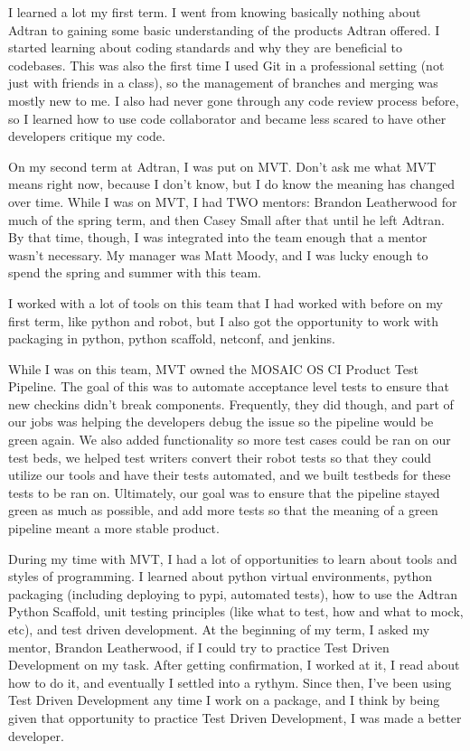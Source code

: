 \documentclass[12pt, letterpaper]{article}
\begin{document}
\par
I learned a lot my first term. I went from knowing basically nothing about Adtran to gaining some
basic understanding of the products Adtran offered. I started learning about coding standards and why they are beneficial to codebases. This was also the first time I used Git in a
professional setting (not just with friends in a class), so the management of branches and merging
was mostly new to me. I also had never gone through any code review process before, so I learned
how to use code collaborator and became less scared to have other developers critique my code.

\par
On my second term at Adtran, I was put on MVT. Don't ask me what MVT means right now, because I
don't know, but I do know the meaning has changed over time. While I was on MVT, I had TWO mentors:
Brandon Leatherwood for much of the spring term, and then Casey Small after that until he left
Adtran. By that time, though, I was integrated into the team enough that a mentor wasn't necessary.
My manager was Matt Moody, and I was lucky enough to spend the spring and summer with this team.

\par
I worked with a lot of tools on this team that I had worked with before on my first term,
like python and robot, but I also got the opportunity to work with packaging in python, python scaffold, netconf, and jenkins.

\par
While I was on this team, MVT owned the MOSAIC OS CI Product Test Pipeline. The goal of this was to
automate acceptance level tests to ensure that new checkins didn't break components. Frequently,
they did though, and part of our jobs was helping the developers debug the issue so the pipeline
would be green again. We also added functionality so more test cases could be ran on our test beds,
we helped test writers convert their robot tests so that they could utilize our tools and have
their tests automated, and we built testbeds for these tests to be ran on. Ultimately, our goal was
to ensure that the pipeline stayed green as much as possible, and add more tests so that the
meaning of a green pipeline meant a more stable product.

\par
During my time with MVT, I had a lot of opportunities to learn about tools and styles of
programming. I learned about python virtual environments, python packaging (including deploying to
pypi, automated tests), how to use the Adtran Python Scaffold, unit testing principles (like what
to test, how and what to mock, etc), and test driven development. At the beginning of my term, I
asked my mentor, Brandon Leatherwood, if I could try to practice Test Driven Development on my
task. After getting confirmation, I worked at it, I read about how to do it, and eventually I
settled into a rythym. Since then, I've been using Test Driven Development any time I work on a
package, and I think by being given that opportunity to practice Test Driven Development, I was
made a better developer.
\end{document}
